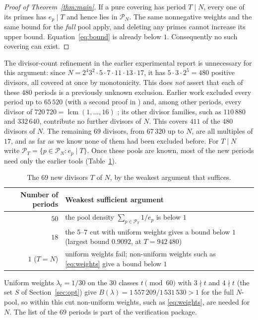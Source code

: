 \documentclass[11pt,a4paper]{article}
\newcommand{\lcm}{\operatorname{lcm}}
\newcommand{\PN}{\mathcal P_N}
\begin{document}
\begin{proof}[Proof of Theorem~\ref{thm:main}]
If a pure covering has period $T\mid N$, every one of its primes has $e_p\mid T$ and hence lies in $\PN$. The same nonnegative weights and the same bound for the \emph{full} pool apply, and deleting any primes cannot increase its upper bound. Equation~\eqref{eq:bound} is already below $1$. Consequently no such covering can exist.\qedhere
\end{proof}

The divisor-count refinement in the earlier experimental report is unnecessary for this argument: since $N=2^4 3^2\cdot5\cdot7\cdot11\cdot13\cdot17$, it has $5\cdot3\cdot2^5=480$ positive divisors, all covered at once by monotonicity. This does \emph{not} assert that each of these 480 periods is a previously unknown exclusion. Earlier work excluded every period up to $65\,520$ \cite{ProblemADayOct12} (with a second proof in \cite{ProblemADayOct14}) and, among other periods, every divisor of $720\,720=\lcm(1,\ldots,16)$ \cite{ProblemADayOct14}; its other divisor families, such as $110\,880$ and $332\,640$, contribute no further divisors of $N$. This covers $411$ of the $480$ divisors of $N$. The remaining $69$ divisors, from $67\,320$ up to $N$, are all multiples of $17$, and as far as we know none of them had been excluded before. For $T\mid N$ write $\mathcal P_T=\{p\in\PN:e_p\mid T\}$. Once these pools are known, most of the new periods need only the earlier tools (Table~\ref{tab:new}).

\begin{table}[htbp]
\centering\small
\caption{The $69$ new divisors $T$ of $N$, by the weakest argument that suffices.}
\label{tab:new}
\begin{tabularx}{\linewidth}{@{}rX@{}}\toprule
Number of periods & Weakest sufficient argument\\\midrule
$50$ & the pool density $\sum_{p\in\mathcal P_T}1/e_p$ is below $1$\\
$18$ & the 5--7 cut with uniform weights gives a bound below $1$ (largest bound $0.9092$, at $T=942\,480$)\\
$1$ ($T=N$) & uniform weights fail; non-uniform weights such as \eqref{eq:weights} give a bound below $1$\\\bottomrule
\end{tabularx}
\end{table}

Uniform weights $\lambda_t=1/30$ on the $30$ classes $t\pmod{60}$ with $3\nmid t$ and $4\nmid t$ (the set $S$ of Section~\ref{sec:opt}) give $B(\lambda)=1\,557\,209/1\,531\,530>1$ for the full $N$-pool, so within this cut non-uniform weights, such as \eqref{eq:weights}, are needed for $N$. The list of the $69$ periods is part of the verification package.
\end{document}
